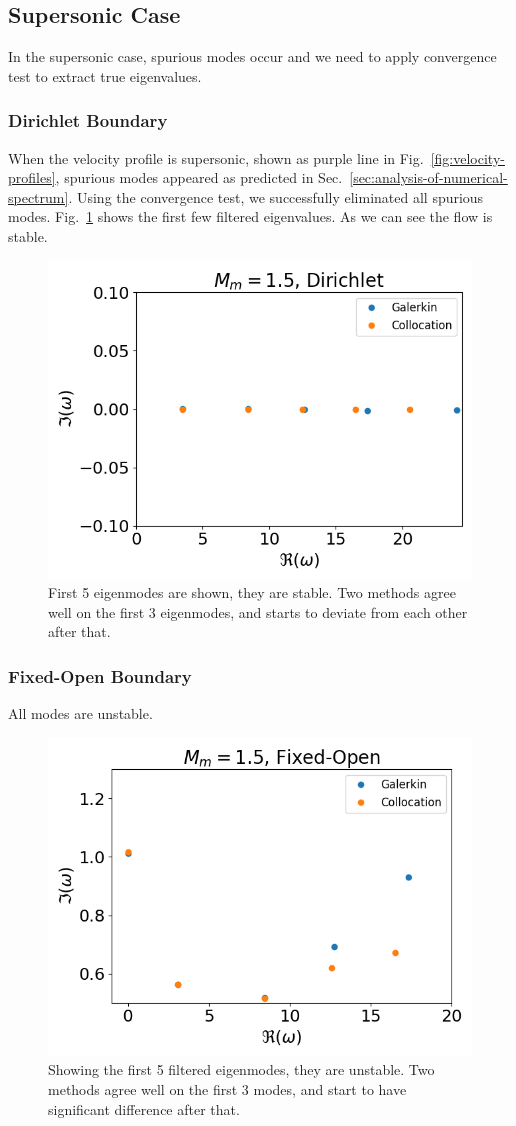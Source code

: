\subsection{Supersonic Case}
In the supersonic case, spurious modes occur and we need to apply convergence test to extract true eigenvalues.
\subsubsection*{Dirichlet Boundary}
When the velocity profile is supersonic, shown as purple line in Fig.~\ref{fig:velocity-profiles}, spurious modes appeared as predicted in Sec.~\ref{sec:analysis-of-numerical-spectrum}. Using the convergence test, we successfully eliminated all spurious modes. Fig.~\ref{fig:supersonic-dirichlet} shows the first few filtered eigenvalues. As we can see the flow is stable.
\begin{figure} [H]
	\centering
	\includegraphics[width=0.7\linewidth]{figures/supersonic-drichlet.png}
	\caption{First 5 eigenmodes are shown, they are stable. Two methods agree well on the first 3 eigenmodes, and starts to deviate from each other after that.}
	\label{fig:supersonic-dirichlet}
\end{figure}

\subsubsection*{Fixed-Open Boundary}
All modes are unstable.
\begin{figure} [H]
	\centering
	\includegraphics[width=0.7\linewidth]{figures/supersonic-fixed-open.png}
	\caption{Showing the first 5 filtered eigenmodes, they are unstable. Two methods agree well on the first 3 modes, and start to have significant difference after that.}
	\label{fig:supersonic-fixed-open}
\end{figure}
